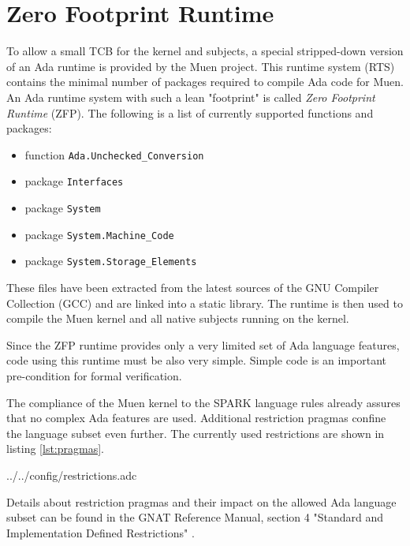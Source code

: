 \section{Zero Footprint Runtime}\label{sec:zfp-rts}
To allow a small TCB for the kernel and subjects, a special stripped-down
version of an Ada runtime is provided by the Muen project. This
runtime system (RTS) contains the minimal number of packages
required to compile Ada code for Muen. An Ada runtime system with such a lean
"footprint" is called \emph{Zero Footprint Runtime} (ZFP). The
following is a list of currently supported functions and packages:

\begin{itemize}
	\item function \texttt{Ada.Unchecked\_Conversion}
	\item package \texttt{Interfaces}
	\item package \texttt{System}
	\item package \texttt{System.Machine\_Code}
	\item package \texttt{System.Storage\_Elements}
\end{itemize}

These files have been extracted from the latest sources of the GNU Compiler
Collection (GCC) \cite{gcc} and are linked into a static library.
The runtime is then used to compile the Muen kernel and all native subjects
running on the kernel.

Since the ZFP runtime provides only a very limited set of Ada language features,
code using this runtime must be also very simple. Simple code is an important
pre-condition for formal verification.

The compliance of the Muen kernel to the SPARK language rules
already assures that no complex Ada features are used. Additional restriction
pragmas confine the language subset even further. The currently
used restrictions are shown in listing \ref{lst:pragmas}.


	{../../config/restrictions.adc}

Details about restriction pragmas and their impact on the allowed Ada language
subset can be found in the GNAT Reference Manual, section 4 "Standard and
Implementation Defined Restrictions" \cite{GNAT:manual}.
